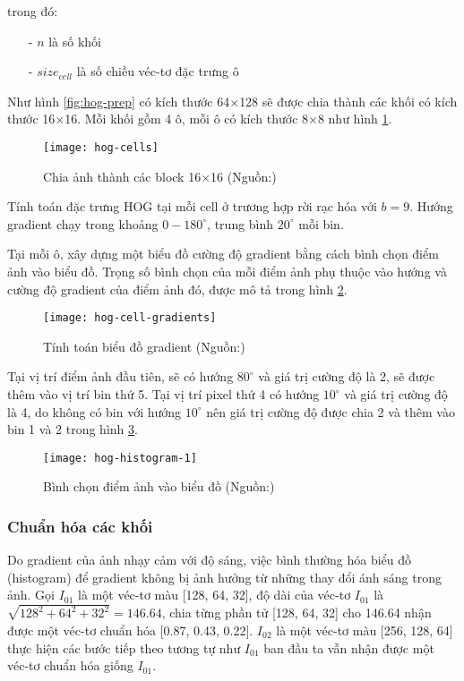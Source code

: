 trong đó:

\begin{itemize}
	\item[-] $n$ là số khối
	\item[-] $size_{cell}$ là số chiều véc-tơ đặc trưng ô
\end{itemize}

Như hình \ref{fig:hog-prep} có kích thước 64$\times$128 sẽ được chia thành các khối có kích thước 16$\times$16. Mỗi khối gồm 4 ô, mỗi ô có kích thước 8$\times$8 như hình \ref{fig:hog-cells}.
\begin{figure}[h]
	\centering
	\texttt{[image: hog-cells]}
	\caption[Chia ảnh thành các block 16$\times$16]{Chia ảnh thành các block 16$\times$16 (Nguồn:\cite{learnopencv})}
	\label{fig:hog-cells}
\end{figure}
Tính toán đặc trưng HOG tại mỗi cell ở trương hợp rời rạc hóa với $b=9$. Hướng gradient chạy trong khoảng $0 - 180^{\circ}$, trung bình $20^{\circ}$ mỗi bin.\par

Tại mỗi ô, xây dựng một biểu đồ cường độ gradient bằng cách bình chọn điểm ảnh vào biểu đồ. Trọng số bình chọn của mỗi điểm ảnh phụ thuộc vào hướng và cường độ gradient của điểm ảnh đó, được mô tả trong hình \ref{fig:hog-cell-gradients}.
\begin{figure}[h]
	\centering
	\texttt{[image: hog-cell-gradients]}
	\caption[Tính toán biểu đồ gradient]{Tính toán biểu đồ gradient (Nguồn:\cite{learnopencv})}
	\label{fig:hog-cell-gradients}
\end{figure}

Tại vị trí điểm ảnh đầu tiên, sẽ có hướng $80^{\circ}$ và giá trị cường độ là 2, sẽ được thêm vào vị trí bin thứ 5. Tại vị trí pixel thứ 4 có hướng $10^{\circ}$ và giá trị cường độ là 4, do không có bin với hướng $10^{\circ}$ nên giá trị cường độ được chia 2 và thêm vào bin 1 và 2 trong hình \ref{fig:hog-histogram-1}.
\begin{figure}[h]
	\centering
	\texttt{[image: hog-histogram-1]}
	\caption[Bình chọn điểm ảnh vào biểu đồ]{Bình chọn điểm ảnh vào biểu đồ (Nguồn:\cite{learnopencv})}
	\label{fig:hog-histogram-1}
\end{figure}

\subsubsection{Chuẩn hóa các khối}
Do gradient của ảnh nhạy cảm với độ sáng, việc bình thường hóa biểu đồ (histogram) để gradient không bị ảnh hưởng từ những thay đổi ánh sáng trong ảnh. Gọi $I_{01}$ là một véc-tơ màu [128, 64, 32], độ dài của véc-tơ $I_{01}$ là $\sqrt{128^2 + 64^2 + 32^2} = 146. 64$, chia từng phần tử [128, 64, 32] cho 146.64 nhận được một véc-tơ chuẩn hóa [0.87, 0.43, 0.22]. $I_{02}$ là một véc-tơ màu [256, 128, 64] thực hiện các bước tiếp theo tương tự như $I_{01}$ ban đầu ta vẫn nhận được một véc-tơ chuẩn hóa giống $I_{01}$.\par

